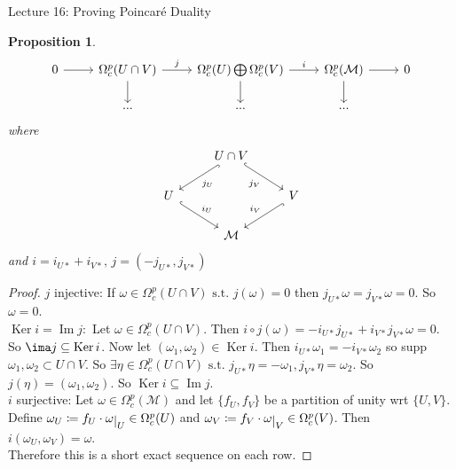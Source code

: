 \documentclass[10pt]{article}
\theoremstyle{plain}
\newtheorem{prop}[thm]{Proposition}
\theoremstyle{definition}
\newcommand{\st}{\text{ s.t. }}
\newcommand{\man}{\mathcal{M}}
\def\restrict#1{\raise-.5ex\hbox{\ensuremath|}_{#1}}
\DeclareMathOperator{\Ker}{Ker}
\DeclareMathOperator{\Ima}{Im}
\begin{document}
\begin{section}{Lecture 16: Proving Poincar\'e Duality}
\begin{prop}
$$\begin{tikzcd}
0 \arrow[r] & \Omega_c^p(U\cap V) \arrow[r, "j"] \arrow[d] & \Omega_c^p(U) \bigoplus \Omega_c^p(V) \arrow[r, "i"] \arrow[d] & \Omega_c^p(\mathcal{M}) \arrow[r] \arrow[d] & 0 \\
            & ...                                          & ...                                                            & ...                                         &  
\end{tikzcd}$$
where 
$$%
\begin{tikzcd}
                          & U\cap V \arrow[rd, "j_V"', hook] \arrow[ld, "j_U", hook] &                            \\
U \arrow[rd, "i_U", hook] &                                                          & V \arrow[ld, "i_V"', hook] \\
                          & \mathcal{M}                                              &                           
\end{tikzcd}$$
and $i = i_{U*} + i_{V*}, \, j= (-j_{U*},j_{V*})$
\end{prop}
\begin{proof}
$j$ injective: If $\omega \in \Omega^p_c(U\cap V) \st j(\omega) = 0 $ then $ j_{U*} \omega = j_{V*} \omega= 0 $. So $\omega = 0$.\\
$\Ker i = \Ima j:$ Let $\omega \in \Omega^p_c(U\cap V)$. Then $i \circ j (\omega) = - i_{U*} j_{U*} + i_{V*} j_{V*} \omega = 0$. So $\ima j \subseteq \Ker i$. Now let $(\omega_1,\omega_2) \in \Ker i$. Then $i_{U*} \omega_1 = -i_{V*} \omega_2$ so supp $\omega_1,\omega_2 \subset U\cap V$. So $\exists \eta \in \Omega_c^p(U\cap V) \st j_{U*}\eta = -\omega_1, j_{V*} \eta = \omega_2$. So $j(\eta) = (\omega_1,\omega_2).$ So $\Ker i \subseteq \Ima j$. \\
$i$ surjective: Let $\omega \in \Omega_c^p(\man)$ and let $\{f_U,f_V\}$ be a partition of unity wrt $\{U,V\}$. Define $\omega_U \coloneqq f_U \cdot \omega\restrict{U} \in \Omega_c^p(U)$ and $\omega_V \coloneqq f_V \cdot \omega\restrict{V} \in \Omega_c^p(V)$. Then $i(\omega_U,\omega_V) = \omega$.\\
Therefore this is a short exact sequence on each row.
\end{proof}

\end{section}
\end{document}

